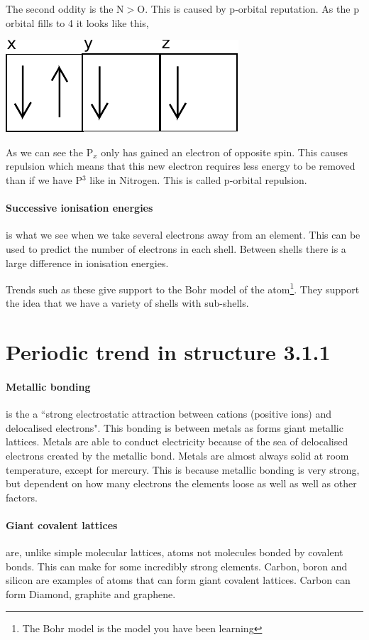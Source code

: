 	The second oddity is the N$>$O. This is caused by p-orbital reputation.
	As the p orbital fills to 4 it looks like this,
	\begin{center}
		\includegraphics{P4orbital}
	\end{center}
	As we can see the P$_x$ only has gained an electron of opposite spin.
	This causes repulsion which means that this new electron requires less energy to be removed than if we have P$^3$ like in Nitrogen.
	This is called p-orbital repulsion.
	
	\paragraph{Successive ionisation energies} is what we see when we take several electrons away from an element.
	This can be used to predict the number of electrons in each shell.
	Between shells there is a large difference in ionisation energies.
	
	Trends such as these give support to the Bohr model of the atom\footnote{The Bohr model is the model you have been learning}.
	They support the idea that we have a variety of shells with sub-shells.
	
\section{Periodic trend in structure 3.1.1}
	
	\paragraph{Metallic bonding} is the a ``strong electrostatic attraction between cations (positive ions) and delocalised electrons".
	This bonding is between metals as forms giant metallic lattices.
	Metals are able to conduct electricity because of the sea of delocalised electrons created by the metallic bond.
	Metals are almost always solid at room temperature, except for mercury.
	This is because metallic bonding is very strong, but dependent on how many electrons the elements loose as well as well as other factors.
	
	\paragraph{Giant covalent lattices} are, unlike simple molecular lattices, atoms not molecules bonded by covalent bonds.
	This can make for some incredibly strong elements.
	Carbon, boron and silicon are examples of atoms that can form giant covalent lattices.
	Carbon can form Diamond, graphite and graphene.
	
